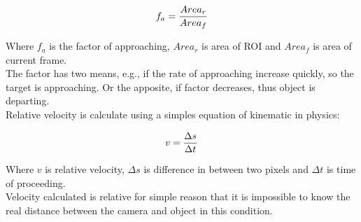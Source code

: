 \begin{equation}
\centering
\everymath{\displaystyle}
f_a = \frac{Area_r}{Area_f} 
\end{equation}

Where $f_a$ is the factor of approaching, $Area_r$ is area of ROI and $Area_f$ 
is area of current frame.\\
The factor has two means, e.g., if the rate of approaching increase quickly, so 
the target is approaching. Or the apposite, if factor decreases, thus 
object is departing.\\
Relative velocity is calculate using a simples equation of kinematic in physics:


\begin{equation}
\centering
\everymath{\displaystyle}
 v = \frac{\Delta s}{\Delta t}
\end{equation}

Where $v$ is relative velocity, $\Delta s$ is difference in between two pixels and 
$\Delta t$ is time of proceeding.\\
Velocity calculated is relative for simple reason that it is impossible to know 
the real distance between the camera and object in this
condition.\\
